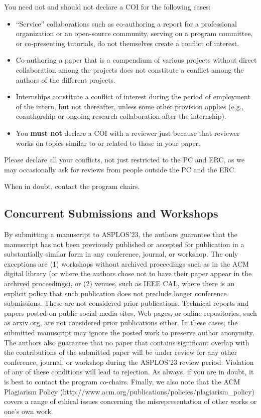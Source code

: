 \documentclass[pageno]{jpaper}
\begin{document}
You need not and should not declare a COI for the following cases:

\begin{itemize}
\item ``Service'' collaborations such as co-authoring a report for a professional
organization or an open-source community, serving on a program committee, or co-presenting
tutorials, do not themselves create a conflict of interest.

\item Co-authoring a paper that is a compendium of various projects without
direct collaboration among the projects does not constitute a
conflict among the authors of the different projects.

\item Internships constitute a conflict of interest during the period of employment of the intern, but not thereafter, unless some other provision applies (e.g., coauthorship or ongoing research collaboration after the internship).

\item You \textbf{must not} declare a COI with a reviewer just because that reviewer works on topics similar to or related to those in your paper. 

\end{itemize}

Please declare all your conflicts, not just restricted to the PC and ERC, as we may occasionally ask for reviews from people outside the PC and the ERC. 

When in doubt, contact the program chairs.

\subsection{Concurrent Submissions and Workshops}

By submitting a manuscript to ASPLOS'23, the authors guarantee that the
manuscript has not been previously published or accepted for publication in
a substantially similar form in any conference, journal, or workshop. The
only exceptions are (1) workshops without archived proceedings such as in
the ACM digital library (or where the authors chose not to have their paper
appear in the archived proceedings), or (2) venues, such as IEEE CAL, where
there is an explicit policy that such publication does not preclude longer
conference submissions. These are not considered prior publications. 
Technical reports and papers posted on public social media sites, Web pages,
or online repositories, such as arxiv.org, are not considered prior
publications either. In these cases, the submitted manuscript may
ignore the posted work to preserve author anonymity. 
The authors also guarantee that no paper that contains
significant overlap with the contributions of the submitted paper will be
under review for any other conference, journal, or workshop during the
ASPLOS'23 review period. Violation of any of these conditions will lead to
rejection. As always, if you are in doubt, it is best to contact the
program co-chairs.  Finally, we also note that the ACM Plagiarism Policy
(http://www.acm.org/publications/policies/plagiarism\_policy) covers a range
of ethical issues concerning the misrepresentation of other works or one's
own work.
\end{document}
